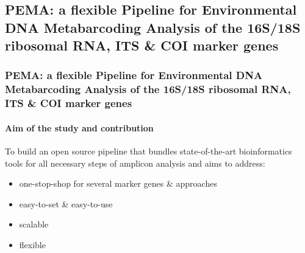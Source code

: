\documentclass{beamer}
\begin{document}
   \begin{darkframes}
      \subsection{PEMA: a flexible Pipeline for Environmental DNA Metabarcoding Analysis of the
      16S/18S ribosomal RNA, ITS \& COI marker genes}
   \end{darkframes}
   
   \begin{darkframes}
      \begin{frame}
         \frametitle{PEMA: a flexible Pipeline for Environmental DNA Metabarcoding Analysis of the
         16S/18S ribosomal RNA, ITS \& COI marker genes}
         \framesubtitle{Aim of the study and contribution}

         To build an open source
         pipeline that bundles state-of-the-art bioinformatics tools for all necessary steps of
         amplicon analysis and aims to address:
         \begin{itemize}
            \item one-stop-shop for several marker genes \& approaches
            \item easy-to-set \& easy-to-use 
            \item scalable
            \item flexible
         \end{itemize}
      \end{frame}
   \end{darkframes}
\end{document}
